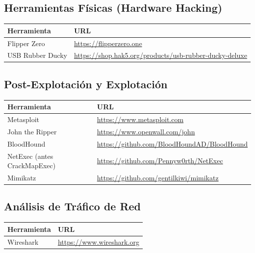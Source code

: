 \documentclass[a4paper, 11pt]{article}
\begin{document}
\subsection*{Herramientas Físicas (Hardware Hacking)}
\begin{table}[H]
\centering
\begin{tabular}{|m{5cm}|m{10cm}|}
\hline
\textbf{Herramienta} & \textbf{URL} \\
\hline
Flipper Zero & \url{https://flipperzero.one} \\
\hline
USB Rubber Ducky & \url{https://shop.hak5.org/products/usb-rubber-ducky-deluxe} \\
\hline
\end{tabular}
\end{table}

\subsection*{Post-Explotación y Explotación}
\begin{table}[H]
\centering
\begin{tabular}{|m{5cm}|m{10cm}|}
\hline
\textbf{Herramienta} & \textbf{URL} \\
\hline
Metasploit & \url{https://www.metasploit.com} \\
\hline
John the Ripper & \url{https://www.openwall.com/john} \\
\hline
BloodHound & \url{https://github.com/BloodHoundAD/BloodHound} \\
\hline
NetExec (antes CrackMapExec) & \url{https://github.com/Pennyw0rth/NetExec} \\
\hline
Mimikatz & \url{https://github.com/gentilkiwi/mimikatz} \\
\hline
\end{tabular}
\end{table}

\subsection*{Análisis de Tráfico de Red}
\begin{table}[H]
\centering
\begin{tabular}{|m{5cm}|m{10cm}|}
\hline
\textbf{Herramienta} & \textbf{URL} \\
\hline
Wireshark & \url{https://www.wireshark.org} \\
\hline
\end{tabular}
\end{table}
\end{document}
